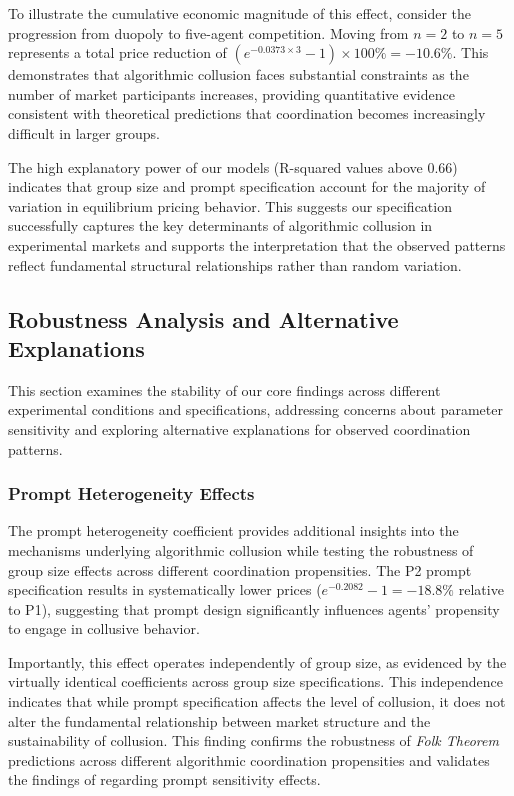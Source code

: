 To illustrate the cumulative economic magnitude of this effect, consider the progression from duopoly to five-agent competition. Moving from $n=2$ to $n=5$ represents a total price reduction of $(e^{-0.0373 \times 3} - 1) \times 100\% = -10.6\%$. This demonstrates that algorithmic collusion faces substantial constraints as the number of market participants increases, providing quantitative evidence consistent with theoretical predictions that coordination becomes increasingly difficult in larger groups.

The high explanatory power of our models (R-squared values above 0.66) indicates that group size and prompt specification account for the majority of variation in equilibrium pricing behavior. This suggests our specification successfully captures the key determinants of algorithmic collusion in experimental markets and supports the interpretation that the observed patterns reflect fundamental structural relationships rather than random variation.

\subsection{Robustness Analysis and Alternative Explanations}

This section examines the stability of our core findings across different experimental conditions and specifications, addressing concerns about parameter sensitivity and exploring alternative explanations for observed coordination patterns.

\subsubsection*{Prompt Heterogeneity Effects}

The prompt heterogeneity coefficient provides additional insights into the mechanisms underlying algorithmic collusion while testing the robustness of group size effects across different coordination propensities. The P2 prompt specification results in systematically lower prices ($e^{-0.2082} - 1 = -18.8\%$ relative to P1), suggesting that prompt design significantly influences agents' propensity to engage in collusive behavior.

Importantly, this effect operates independently of group size, as evidenced by the virtually identical coefficients across group size specifications. This independence indicates that while prompt specification affects the level of collusion, it does not alter the fundamental relationship between market structure and the sustainability of collusion. This finding confirms the robustness of \emph{Folk Theorem} predictions across different algorithmic coordination propensities and validates the findings of \textcite{fish_algorithmic_2025} regarding prompt sensitivity effects.

